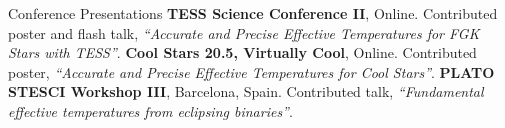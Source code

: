 \begin{rubric}{Conference Presentations}
\entry*[2021]%
	\textbf{TESS Science Conference II}, Online. Contributed poster and flash talk, \textit{``Accurate and Precise Effective Temperatures for FGK Stars with TESS''}. 
\entry*[2021]%
	\textbf{Cool Stars 20.5, Virtually Cool}, Online. Contributed poster, \textit{``Accurate and Precise Effective Temperatures for Cool Stars''}. 
\entry*[2019]%
	\textbf{PLATO STESCI Workshop III}, Barcelona, Spain. Contributed talk, \textit{``Fundamental effective temperatures from eclipsing binaries''}.  
%
%
%
%
\end{rubric}